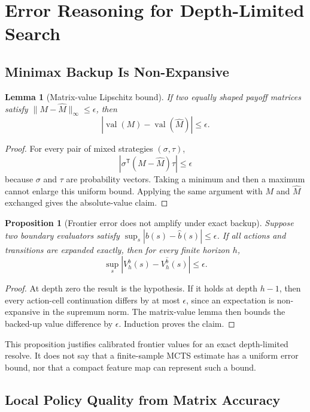 \documentclass[11pt]{article}
\newtheorem{proposition}{Proposition}
\newtheorem{lemma}{Lemma}
\newcommand{\val}{\operatorname{val}}
\begin{document}
\section{Error Reasoning for Depth-Limited Search}

\subsection{Minimax Backup Is Non-Expansive}

\begin{lemma}[Matrix-value Lipschitz bound]
If two equally shaped payoff matrices satisfy
\(\lVert M-\widehat M\rVert_{\infty}\le\epsilon\), then
\[
\left|\val(M)-\val(\widehat M)\right|\le\epsilon.
\]
\end{lemma}

\begin{proof}
For every pair of mixed strategies \((\sigma,\tau)\),
\[
\left|\sigma^{\mathsf T}(M-\widehat M)\tau\right|
\le\epsilon
\]
because \(\sigma\) and \(\tau\) are probability vectors. Taking a minimum
and then a maximum cannot enlarge this uniform bound. Applying the same
argument with \(M\) and \(\widehat M\) exchanged gives the absolute-value
claim.
\end{proof}

\begin{proposition}[Frontier error does not amplify under exact backup]
Suppose two boundary evaluators satisfy
\(\sup_s|b(s)-\widehat b(s)|\le\epsilon\). If all actions and transitions are
expanded exactly, then for every finite horizon \(h\),
\[
\sup_s|V_h^b(s)-V_h^{\widehat b}(s)|\le\epsilon.
\]
\end{proposition}

\begin{proof}
At depth zero the result is the hypothesis. If it holds at depth \(h-1\),
then every action-cell continuation differs by at most \(\epsilon\), since an
expectation is non-expansive in the supremum norm. The matrix-value lemma then
bounds the backed-up value difference by \(\epsilon\). Induction proves the
claim.
\end{proof}

This proposition justifies calibrated frontier values for an exact
depth-limited resolve. It does not say that a finite-sample MCTS estimate has a
uniform error bound, nor that a compact feature map can represent such a
bound.

\subsection{Local Policy Quality from Matrix Accuracy}
\end{document}
